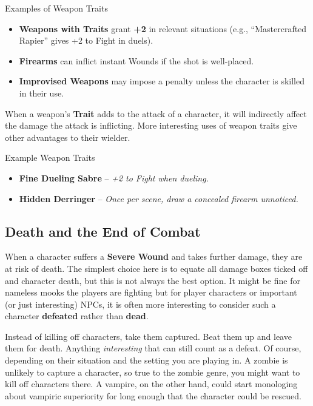 \begin{multicols}{2}
\begin{Example}{Examples of Weapon Traits}
	\begin{itemize}
    	\item \textbf{Weapons with Traits} grant \textbf{+2} in relevant situations (e.g., “Mastercrafted Rapier” gives +2 to Fight in duels).
	    \item \textbf{Firearms} can inflict instant Wounds if the shot is well-placed.
    	\item \textbf{Improvised Weapons} may impose a penalty unless the character is skilled in their use.
	\end{itemize}
\end{Example}

When a weapon's \textbf{Trait} adds to the attack of a character, it will indirectly affect the damage the attack is inflicting. More interesting uses of weapon traits give other advantages to their wielder.

\begin{Example}{Example Weapon Traits}
	\begin{itemize}
    	\item \textbf{Fine Dueling Sabre} – \textit{+2 to Fight when dueling.}
	    \item \textbf{Hidden Derringer} – \textit{Once per scene, draw a concealed firearm unnoticed.}
	\end{itemize}
\end{Example}

\subsection{Death and the End of Combat}\label{core:death}
When a character suffers a \textbf{Severe Wound} and takes further damage, they are at risk of death. The simplest choice here is to equate all damage boxes ticked off and character death, but this is not always the best option. It might be fine for nameless mooks the players are fighting but for player characters or important (or just interesting) NPCs, it is often more interesting to consider such a character \textbf{defeated} rather than \textbf{dead}.

Instead of killing off characters, take them captured. Beat them up and leave them for death. Anything \emph{interesting} that can still count as a defeat. Of course, depending on their situation and the setting you are playing in. A zombie is unlikely to capture a character, so true to the zombie genre, you might want to kill off characters there. A vampire, on the other hand, could start monologing about vampiric superiority for long enough that the character could be rescued. 


\end{multicols}
